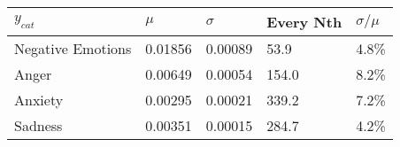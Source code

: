 \begin{tabular}{lllll}
\toprule
$y_{cat}$ &    $\mu$ & $\sigma$ & Every Nth & $\sigma / \mu$ \\
\midrule
Negative Emotions &  0.01856 &  0.00089 &      53.9 &          4.8\% \\
Anger             &  0.00649 &  0.00054 &     154.0 &          8.2\% \\
Anxiety           &  0.00295 &  0.00021 &     339.2 &          7.2\% \\
Sadness           &  0.00351 &  0.00015 &     284.7 &          4.2\% \\
\bottomrule
\end{tabular}
